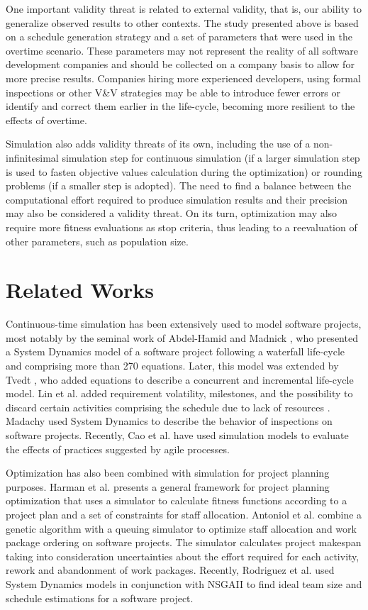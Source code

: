 \documentclass[conference]{IEEEtran}
\begin{document}
One important validity threat is related to external validity, that is, our ability to generalize observed results to other contexts. The study presented above is based on a schedule generation strategy and a set of parameters that were used in the overtime scenario. These parameters may not represent the reality of all software development companies and should be collected on a company basis to allow for more precise results. Companies hiring more experienced developers, using formal inspections or other V\&V strategies may be able to introduce fewer errors or identify and correct them earlier in the life-cycle, becoming more resilient to the effects of overtime.

Simulation also adds validity threats of its own, including the use of a non-infinitesimal simulation step for continuous simulation (if a larger simulation step is used to fasten objective values calculation during the optimization) or rounding problems (if a smaller step is adopted). The need to find a balance between the computational effort required to produce simulation results and their precision may also be considered a validity threat. On its turn, optimization may also require more fitness evaluations as stop criteria, thus leading to a reevaluation of other parameters, such as population size.

\section{Related Works}

Continuous-time simulation has been extensively used to model software projects, most notably by the seminal work of Abdel-Hamid and Madnick \cite{Abdel-Hamid:1991}, who presented a System Dynamics model of a software project following a waterfall life-cycle and comprising more than 270 equations. Later, this model was extended by Tvedt \cite{Tvedt:1996}, who added equations to describe a concurrent and incremental life-cycle model. Lin et al. added requirement volatility, milestones, and the possibility to discard certain activities comprising the schedule due to lack of resources \cite{Lin:1997}. Madachy \cite{Madachy:1996} used System Dynamics to describe the behavior of inspections on software projects. Recently, Cao et al. \cite{Cao:2010} have used simulation models to evaluate the effects of practices suggested by agile processes.

Optimization has also been combined with simulation for project planning purposes. Harman et al. \cite{harman:2009} presents a general framework for project planning optimization that uses a simulator to calculate fitness functions according to a project plan and a set of constraints for staff allocation. Antoniol et al. \cite{Antoniol:2004} combine a genetic algorithm with a queuing simulator to optimize staff allocation and work package ordering on software projects. The simulator calculates project makespan taking into consideration uncertainties about the effort required for each activity, rework and abandonment of work packages. Recently, Rodriguez et al. \cite{Rodriguez:2011} used System Dynamics models in conjunction with NSGAII to find ideal team size and schedule estimations for a software project.
\end{document}
